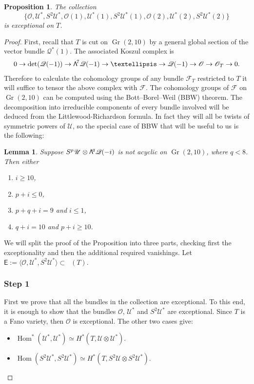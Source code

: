 \documentclass[11pt]{article}
\newcommand\bw[1]{{\hbox{\large$\mathsf{\Lambda}$}^{\!#1}}}
\let\mathcal\mathscr
\theoremstyle{plain}
\newtheorem{prop}[theorem]{Proposition}
\newtheorem{lemma}[theorem]{Lemma}
\theoremstyle{definition}
\newcommand{\cat}[1]{\mathsf{#1}}
\newcommand{\sod}[1]{\langle #1 \rangle}
\DeclareMathOperator{\Db}{{\cat{D}^{\mathrm{b}}}}
\DeclareMathOperator{\Gr}{Gr}
\DeclareMathOperator{\Hom}{Hom}
\newcommand{\sheaf}[1]{\mathcal{#1}}
\newcommand{\ko}{\sheaf{O}}\let\OO\ko\let\cO\ko
\newcommand{\kq}{\sheaf{Q}}
\newcommand{\ku}{\sheaf{U}}
\begin{document}
\begin{prop}\label{prop:exc-coll-on-T}
The collection
\[
\{\ko,\ku^*,S^2\ku^*,\ko(1),\ku^*(1),S^2\ku^*(1),\ko(2),\ku^*(2),S^2\ku^*(2)\}
\]
is exceptional on $T$.
\end{prop}

\begin{proof}
First, recall that $T$ is cut on $\Gr(2,10)$ by a general global section of the vector bundle $\kq^*(1)$. The associated Koszul complex is \begin{equation*}\label{eqn:koszul}
0 \to \det(\kq(-1)) \to \bw7\kq(-1) \to \ldots \to \kq(-1) \to \OO \to \OO_T \to 0.
\end{equation*}
Therefore to calculate the cohomology groups of any bundle $\mathcal{F}_T$ restricted to $T$ it will suffice to tensor the above complex with $\mathcal{F}$. The cohomology groups of $\mathcal{F}$ on $\Gr(2,10)$ can be computed using the Bott--Borel--Weil (BBW) theorem. The decomposition into irreducible components of every bundle involved will be deduced from the Littlewood-Richardson formula. In fact they will all be twists of symmetric powers of $\ku$, so the special case of BBW that will be useful to us is the following:

\begin{lemma}\label{BBW}
Suppose $S^p\ku\otimes\bw{q}\kq (-i)$ is not acyclic on $\Gr(2,10)$, where $q<8$.
Then either
\begin{enumerate}
\item $i\ge 10$,
\item $p+i\le 0$,
\item $p+q+i=9$ and $i\le 1$,
\item $q+i=10$ and $p+i\ge 10$.
\end{enumerate}
\end{lemma}

We will split the proof of the Proposition into three parts,
checking first the exceptionality and then the additional required vanishings.
Let $\cat{E}:= \sod{\ko,\ku^*,S^2\ku^*} \subset \Db(T)$.

\subsubsection*{Step 1}
First we prove that all the bundles in the collection are exceptional. To this end, it is enough to show that
the bundles $\ko$, $\ku^*$ and $S^2\ku^*$ are exceptional. Since $T$ is a Fano variety, then
$\ko$ is exceptional. The other two cases give:
\begin{itemize}
\item $\Hom^*(\ku^*,\ku^*) \simeq H^*(T,\ku \otimes \ku^*)$.
\item $\Hom(S^2\ku^*,S^2\ku^*) \simeq H^*(T,S^2\ku \otimes S^2\ku^*)$.
\end{itemize}


\end{proof}
\end{document}
